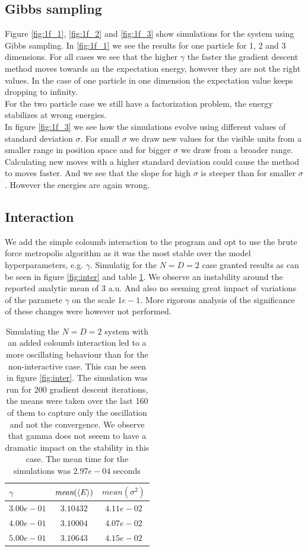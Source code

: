 \subsection{Gibbs sampling}
Figure \ref{fig:1f_1}, \ref{fig:1f_2} and \ref{fig:1f_3} show simulations for the system using Gibbs sampling. In \ref{fig:1f_1} we see the results for one particle for 1, 2 and 3 dimensions. For all cases we see that the higher $\gamma$ the faster the gradient descent method moves towards an the expectation energy, however they are not the right values. In the case of one particle in one dimension the expectation value keeps dropping to infinity. \\
For the two particle case we still have a factorization problem, the energy stabilizes at wrong energies.\\
In figure \ref{fig:1f_3} we see how the simulations evolve using different values of standard deviation $\sigma$. For small $\sigma$ we draw new values for the visible units from a smaller range in position space and for bigger $\sigma$ we draw from a broader range. Calculating new moves with a higher standard deviation could cause the method to moves faster. And we see that the slope for high $\sigma$ is steeper than for smaller $\sigma$. However the energies are again wrong.


\subsection{Interaction}
We add the simple coloumb interaction to the program and opt to use the brute force metropolis algorithm as it was the most stable over the model hyperparameters, e.g. $\gamma$. Simulatig for the $N = D = 2$ case granted results as can be seen in figure \ref{fig:inter} and table \ref{tab:inter}. We observe an instability around the reported analytic mean of 3 a.u. And also no seeming great impact of variations of the paramete $\gamma$ on the scale $1e-1$. More rigorous analysis of the significance of these changes were however not performed. 

\begin{table}
	\begin{tabular}{|l|c|c|}
	\hline
$\gamma$ & $\textit{mean}(\langle E \rangle)$ & $\textit{mean}(\sigma ^2)$ \\
\hline \hline
$3.00e-01$ & $3.10432$ & $4.11e-02$ \\
$4.00e-01$ &  $3.10004$ & $4.07e-02$ \\
$5.00e-01$ &  $3.10643$ & $4.15e-02$ \\
\hline
	\end{tabular}
\caption{Simulating the $N = D = 2$ system with an added coloumb interaction led to a more oscillating behaviour than for the non-interactive case. This can be seen in figure \ref{fig:inter}. The simulation was run for 200 gradient descent iterations, the means were taken over the last 160 of them to capture only the oscillation and not the convergence. We observe that gamma does not seeem to have a dramatic impact on the stability in this case. The mean time for the simulations was $2.97e-04$ seconds}\label{tab:inter}
\end{table}


